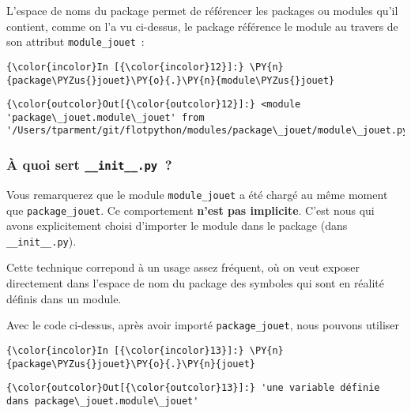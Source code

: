    L'espace de noms du package permet de référencer les packages ou modules
qu'il contient, comme on l'a vu ci-dessus, le package référence le
module au travers de son attribut \texttt{module\_jouet}~:

    \begin{Verbatim}[commandchars=\\\{\},frame=single,framerule=0.3mm,rulecolor=\color{cellframecolor}]
{\color{incolor}In [{\color{incolor}12}]:} \PY{n}{package\PYZus{}jouet}\PY{o}{.}\PY{n}{module\PYZus{}jouet}
\end{Verbatim}


\begin{Verbatim}[commandchars=\\\{\},frame=single,framerule=0.3mm,rulecolor=\color{cellframecolor}]
{\color{outcolor}Out[{\color{outcolor}12}]:} <module 'package\_jouet.module\_jouet' from '/Users/tparment/git/flotpython/modules/package\_jouet/module\_jouet.py'>
\end{Verbatim}
            
    \hypertarget{uxe0-quoi-sert-__init__.py}{%
\subsubsection{\texorpdfstring{À quoi sert
\texttt{\_\_init\_\_.py}~?}{À quoi sert \_\_init\_\_.py~?}}\label{uxe0-quoi-sert-__init__.py}}

    Vous remarquerez que le module \texttt{module\_jouet} a été chargé au
même moment que \texttt{package\_jouet}. Ce comportement \textbf{n'est
pas implicite}. C'est nous qui avons explicitement choisi d'importer le
module dans le package (dans \texttt{\_\_init\_\_.py}).

    Cette technique correpond à un usage assez fréquent, où on veut exposer
directement dans l'espace de nom du package des symboles qui sont en
réalité définis dans un module.

Avec le code ci-dessus, après avoir importé \texttt{package\_jouet},
nous pouvons utiliser

    \begin{Verbatim}[commandchars=\\\{\},frame=single,framerule=0.3mm,rulecolor=\color{cellframecolor}]
{\color{incolor}In [{\color{incolor}13}]:} \PY{n}{package\PYZus{}jouet}\PY{o}{.}\PY{n}{jouet}
\end{Verbatim}


\begin{Verbatim}[commandchars=\\\{\},frame=single,framerule=0.3mm,rulecolor=\color{cellframecolor}]
{\color{outcolor}Out[{\color{outcolor}13}]:} 'une variable définie dans package\_jouet.module\_jouet'
\end{Verbatim}
            
